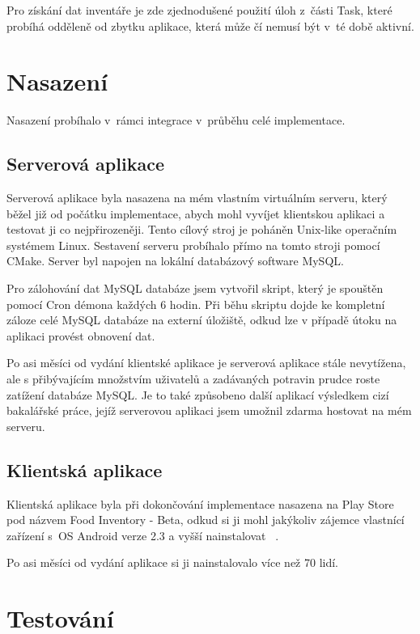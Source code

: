 \documentclass[thesis=B,czech]{FITthesis}[2013/10/20]
\begin{document}
Pro získání dat inventáře je zde zjednodušené použití úloh z~části Task, které probíhá odděleně od zbytku aplikace, která může čí nemusí být v~té době aktivní.

\chapter{Nasazení}

Nasazení probíhalo v~rámci integrace v~průběhu celé implementace.

\section{Serverová aplikace}

Serverová aplikace byla nasazena na mém vlastním virtuálním serveru, který běžel již od počátku implementace, abych mohl vyvíjet klientskou aplikaci a testovat ji co nejpřirozeněji. Tento cílový stroj je poháněn Unix-like operačním systémem Linux. Sestavení serveru probíhalo přímo na tomto stroji pomocí CMake. Server byl napojen na lokální databázový software MySQL. 

Pro zálohování dat MySQL databáze jsem vytvořil skript, který je spouštěn pomocí Cron démona každých 6 hodin. Při běhu skriptu dojde ke kompletní záloze celé MySQL databáze na externí úložiště, odkud lze v případě útoku na aplikaci provést obnovení dat.

Po asi měsíci od vydání klientské aplikace je serverová aplikace stále nevytížena, ale s přibývajícím množstvím uživatelů a zadávaných potravin prudce roste zatížení databáze MySQL. Je to také způsobeno další aplikací výsledkem cizí bakalářské práce, jejíž serverovou aplikaci jsem umožnil zdarma hostovat na mém serveru.

\section{Klientská aplikace}

Klientská aplikace byla při dokončování implementace nasazena na Play Store pod názvem Food Inventory - Beta, odkud si ji mohl jakýkoliv zájemce vlastnící zařízení s~OS Android verze 2.3 a vyšší nainstalovat ~\cite{food_inventory_playstore}.

Po asi měsíci od vydání aplikace si ji nainstalovalo více než 70 lidí.

\chapter{Testování}
\end{document}
